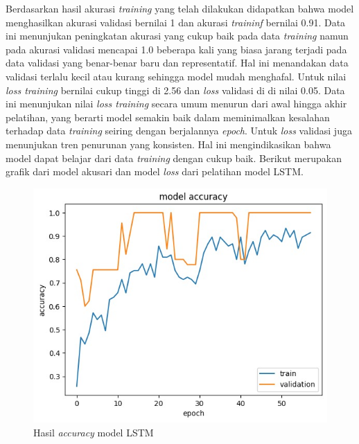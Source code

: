 Berdasarkan hasil akurasi \emph{training} yang telah dilakukan didapatkan bahwa model menghasilkan akurasi validasi bernilai 1 dan akurasi \emph{traininf}
bernilai 0.91. Data ini menunjukan peningkatan akurasi yang cukup baik pada data \emph{training} namun 
pada akurasi validasi mencapai 1.0 beberapa kali yang biasa jarang terjadi pada data validasi yang benar-benar baru dan representatif. Hal ini menandakan
data validasi terlalu kecil  atau kurang sehingga model mudah menghafal. Untuk nilai \emph{loss training} bernilai cukup tinggi di 2.56 dan \emph{loss} validasi di 
di nilai 0.05. Data ini menunjukan nilai \emph{loss training} secara umum menurun dari awal hingga akhir pelatihan, yang berarti model semakin baik dalam 
meminimalkan kesalahan terhadap data \emph{training} seiring dengan berjalannya \emph{epoch}. Untuk \emph{loss} validasi juga menunjukan tren penurunan yang konsisten. 
Hal ini mengindikasikan bahwa model dapat belajar dari data \emph{training} dengan cukup baik. Berikut merupakan grafik dari model akusari dan model \emph{loss} dari pelatihan model LSTM.
\begin{figure} [H] \centering
  \includegraphics[scale=0.5]{gambar/akurasi model.jpg}
  \caption{Hasil \emph{accuracy} model LSTM}
  \label{fig:Pengujian Performa akurasi lstm}
\end{figure}
